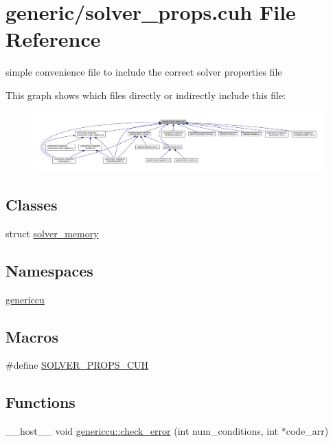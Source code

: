 \hypertarget{solver__props_8cuh}{}\section{generic/solver\+\_\+props.cuh File Reference}
\label{solver__props_8cuh}


simple convenience file to include the correct solver properties file  


This graph shows which files directly or indirectly include this file\+:\nopagebreak
\begin{figure}[H]
\begin{center}
\leavevmode
\includegraphics[width=350pt]{solver__props_8cuh__dep__incl}
\end{center}
\end{figure}
\subsection*{Classes}
\begin{DoxyCompactItemize}
\item 
struct \hyperlink{structsolver__memory}{solver\+\_\+memory}
\end{DoxyCompactItemize}
\subsection*{Namespaces}
\begin{DoxyCompactItemize}
\item 
 \hyperlink{namespacegenericcu}{genericcu}
\end{DoxyCompactItemize}
\subsection*{Macros}
\begin{DoxyCompactItemize}
\item 
\#define \hyperlink{solver__props_8cuh_abab1859a388294ac0be0474379ddc940}{S\+O\+L\+V\+E\+R\+\_\+\+P\+R\+O\+P\+S\+\_\+\+C\+UH}
\end{DoxyCompactItemize}
\subsection*{Functions}
\begin{DoxyCompactItemize}
\item 
\+\_\+\+\_\+host\+\_\+\+\_\+ void \hyperlink{namespacegenericcu_af403dabfc12de79ff9ab8575983d6f83}{genericcu\+::check\+\_\+error} (int num\+\_\+conditions, int $\ast$code\+\_\+arr)
\end{DoxyCompactItemize}


